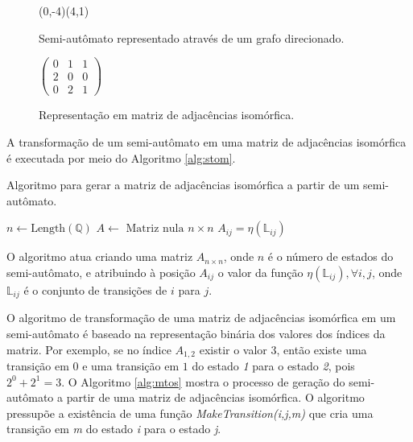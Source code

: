 \documentclass[12pt,a4paper]{article}
\begin{document}
\begin{figure}[ht]
\begin{minipage}[b]{0.5\linewidth}
\begin{center}
\begin{VCPicture}{(0,-4)(4,1)}
 
  
 
\end{VCPicture}
\caption{Semi-autômato representado através de um grafo direcionado.}
\label{fig:semigraph}
\end{center}
\end{minipage}
\hspace{0.5cm}
\begin{minipage}[b]{0.5\linewidth}
\begin{center}
\begin{math}
\begin{pmatrix}
0 & 1 & 1 \\
2 & 0 & 0 \\
0 & 2 & 1
\end{pmatrix}
\end{math}
\caption{Representação em matriz de adjacências isomórfica.}
\label{fig:iadjm}
\end{center}
\end{minipage}
\end{figure}

A transformação de um semi-autômato em uma matriz de adjacências
isomórfica é executada por meio do Algoritmo \ref{alg:stom}.

\begin{algorithm}
\caption{Algoritmo para gerar a matriz de adjacências isomórfica a partir
de um semi-autômato.}
\label{alg:stom}
\begin{algorithmic}
\STATE $n \leftarrow \mbox{Length}(\mathbb{Q})$ 
\STATE $A \leftarrow \mbox{ Matriz nula } n \times n$
\STATE $A_{ij} = \eta(\mathbb{\mathbb{L}}_{ij})$
\ENDIF
\ENDFOR
\end{algorithmic}
\end{algorithm}

O algoritmo atua criando uma matriz $A_{n \times n}$, onde $n$ é o número
de estados do semi-autômato, e atribuindo à posição $A_{ij}$ o valor
da função $\eta(\mathbb{L}_{ij}),\forall i,j$, onde $\mathbb{L}_{ij}$
é o conjunto de transições de $i$ para $j$.

O algoritmo de transformação de uma matriz de adjacências isomórfica em
um semi-autômato é baseado na representação binária dos valores dos
índices da matriz. Por exemplo, se no índice $A_{1,2}$ existir o valor
$3$, então existe uma transição em $0$ e uma transição em $1$ do estado
\emph{1} para o estado \emph{2}, pois $2^0+2^1=3$. O Algoritmo \ref{alg:mtos}
mostra o processo de geração do semi-autômato a partir de uma matriz de
adjacências isomórfica. O algoritmo pressupõe a existência de uma função
\emph{MakeTransition(i,j,m)} que cria uma transição em \emph{m} do estado
\emph{i} para o estado \emph{j}.
\end{document}
